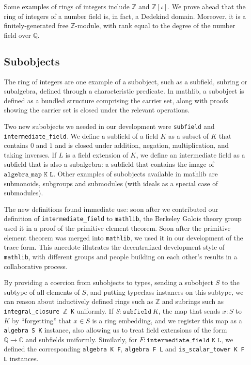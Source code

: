 \documentclass[a4paper,USenglish,cleveref, autoref, thm-restate]{lipics-v2021}
\newcommand{\C}{\mathbb{C}}
\newcommand{\lean}[1]{\texttt{#1}\xspace} %
\newcommand{\mathlib}{\texttt{mathlib}\xspace}
\newcommand{\Q}{\mathbb{Q}}
\newcommand{\Z}{\mathbb{Z}}
\begin{document}
Some examples of rings of integers include $\Z$ and $\Z[\iota]$. We prove ahead that the ring of integers of a number field is, in fact, a Dedekind domain. Moreover, it is a finitely-generated free $\Z$-module, with rank equal to the degree of the number field over $\Q$.


\subsection{Subobjects}

The ring of integers are one example of a subobject, such as a subfield, subring or subalgebra, defined through a characteristic predicate.
In mathlib, a subobject is defined as a bundled structure comprising the carrier set,
along with proofs showing the carrier set is closed under the relevant operations.

Two new subobjects we needed in our development were \lean{subfield} and \lean{intermediate\-\_field}.
We define a subfield of a field $K$ as a subset of $K$ that contains $0$ and $1$ and is closed under addition, negation, multiplication, and taking inverses.
If $L$ is a field extension of $K$, we define an intermediate field as a subfield that is also a subalgebra: a subfield that contains the image of $\lean{algebra\_map K L}$.
Other examples of subobjects available in mathlib are submonoids, subgroups and submodules (with ideals as a special case of submodules).

The new definitions found immediate use:
soon after we contributed our definition of \lean{intermediate\_field} to \mathlib,
the Berkeley Galois theory group used it in a proof of the primitive element theorem.
Soon after the primitive element theorem was merged into \mathlib,
we used it in our development of the trace form.
This anecdote illutrates the decentralized development style of \mathlib,
with different groups and people building on each other's results in a collaborative process.

By providing a coercion from subobjects to types, sending a subobject $S$ to the subtype of all elements of $S$,
and putting typeclass instances on this subtype,
we can reason about inductively defined rings such as $\Z$ and subrings such as \lean{integral\_closure $\Z$ K} uniformly.
If $S : \lean{subfield}\ K$, the map that sends $x : S$ to $K$ by ``forgetting'' that $x \in S$ is a ring embedding,
and we register this map as a \lean{algebra S K} instance, also allowing us to treat field extensions of the form $\Q \to \C$ and subfields uniformly.
Similarly, for $F : \lean{intermediate\_field K L}$, we defined the corresponding \lean{algebra K F}, \lean{algebra F L} and \lean{is\_scalar\_tower K F L} instances.
\end{document}
